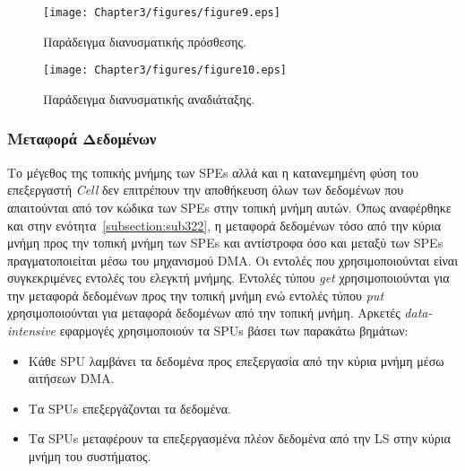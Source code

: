 \begin{figure}
\centering
\texttt{[image: Chapter3/figures/figure9.eps]}
\caption{Παράδειγμα διανυσματικής πρόσθεσης.}
\label{figure:fig39}
\end{figure}

\begin{figure}
\centering
\texttt{[image: Chapter3/figures/figure10.eps]}
\caption{Παράδειγμα διανυσματικής αναδιάταξης.}
\label{figure:fig310}
\end{figure}

\subsubsection{Μεταφορά Δεδομένων}
\label{subsubsection:subsub3322}
\indent
Το μέγεθος της τοπικής μνήμης των \acp{SPE} αλλά και η κατανεμημένη φύση του επεξεργαστή \textsl{Cell} δεν επιτρέπουν την αποθήκευση όλων των δεδομένων που απαιτούνται από τον κώδικα των \acp{SPE} στην τοπική μνήμη αυτών. Όπως αναφέρθηκε και στην ενότητα~\ref{subsection:sub322}, η μεταφορά δεδομένων τόσο από την κύρια μνήμη προς την τοπική μνήμη των \acp{SPE} και αντίστροφα όσο και μεταξύ των \acp{SPE} πραγματοποιείται μέσω του μηχανισμού \ac{DMA}. Οι εντολές που χρησιμοποιούνται είναι συγκεκριμένες εντολές του ελεγκτή μνήμης. Εντολές τύπου \textsl{get} χρησιμοποιούνται για την μεταφορά δεδομένων προς την τοπική μνήμη ενώ εντολές τύπου \textsl{put} χρησιμοποιούνται για μεταφορά δεδομένων από την τοπική μνήμη.\newline \indent
Αρκετές \textsl{data-intensive} εφαρμογές χρησιμοποιούν τα \acp{SPU} βάσει των παρακάτω βημάτων:
\begin{itemize}

\item{Κάθε \ac{SPU} λαμβάνει τα δεδομένα προς επεξεργασία από την κύρια μνήμη μέσω αιτήσεων \ac{DMA}.}

\item{Τα \acp{SPU} επεξεργάζονται τα δεδομένα.}

\item{Τα \acp{SPU} μεταφέρουν τα επεξεργασμένα πλέον δεδομένα από την \ac{LS} στην κύρια μνήμη του συστήματος.}

\end{itemize}
